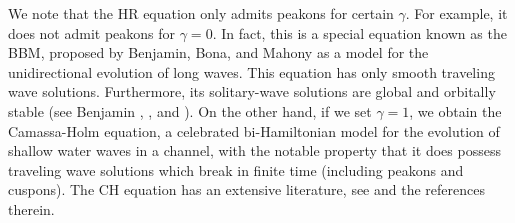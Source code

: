 \documentclass[12pt,reqno]{amsart}
\begin{document}
We note that the HR equation only admits peakons for certain $\gamma$. 
For example, it does not admit peakons for $\gamma = 0$. In fact, this is a
special equation known as the BBM, proposed by 
Benjamin, Bona, and Mahony 
\cite{Benjamin_1972_Model-equations} as a model for 
the unidirectional evolution of long waves. This equation has only smooth
traveling wave solutions. Furthermore, 
its solitary-wave solutions are global and orbitally stable (see Benjamin 
\cite{Benjamin_1972_The-stability-o}, 
\cite{Benjamin_1972_Model-equations}, and 
\cite{Constantin_2000_Stability-of-a-}).
On the other hand, if we set $\gamma =1$, we obtain the Camassa-Holm equation, a celebrated bi-Hamiltonian
model for the evolution of shallow water waves in a channel, with the notable
property that it does possess traveling wave solutions which break in
finite time (including peakons and cuspons). The CH equation has an extensive
literature, see \cite{Himonas_2009_Non-uniform-dep-euler} and the references
therein.
%
%
\end{document}
